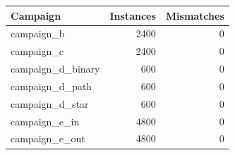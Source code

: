 \begin{tabular}{lrr}
\toprule
Campaign & Instances & Mismatches \\
\midrule
campaign\_b & 2400 & 0 \\
campaign\_c & 2400 & 0 \\
campaign\_d\_binary & 600 & 0 \\
campaign\_d\_path & 600 & 0 \\
campaign\_d\_star & 600 & 0 \\
campaign\_e\_in & 4800 & 0 \\
campaign\_e\_out & 4800 & 0 \\
\bottomrule
\end{tabular}
